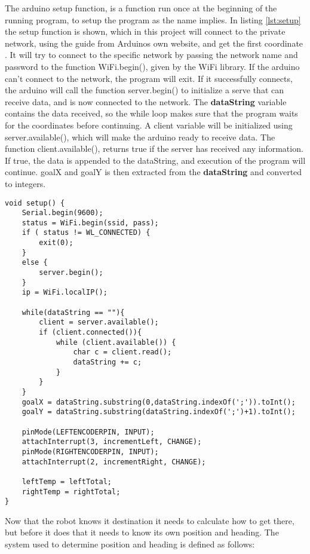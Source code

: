 The arduino setup function, is a function run once at the beginning of the running program, to setup the program as the name implies. In listing \ref{lst:setup} the setup function is shown, which in this project will connect to the private network, using the guide from Arduinos own website, and get the first coordinate \citep{wg}. \newline
It will try to connect to the specific network by passing the network name and password to the function WiFi.begin(), given by the WiFi library. If the arduino can't connect to the network, the program will exit. If it successfully connects, the arduino will call the function server.begin() to initialize a serve that can receive data, and is now connected to the network.
The \textbf{dataString}  variable contains the data received, so the while loop makes sure that the program waits for the coordinates before continuing. A client variable will be initialized using server.available(), which will make the arduino ready to receive data. The function client.available(), returns true if the server has received any information. If true, the data is appended to the dataString, and execution of the program will continue.
\newline
goalX and goalY is then extracted from the \textbf{dataString} and converted to integers.

\begin{lstlisting}[caption={The arduino setup function}, label={lst:setup}]
void setup() {
	Serial.begin(9600);           
	status = WiFi.begin(ssid, pass);
	if ( status != WL_CONNECTED) { 
		exit(0);
	} 
	else {
		server.begin();
	}
	ip = WiFi.localIP();

	while(dataString == ""){
		client = server.available();
		if (client.connected()){
			while (client.available()) {
				char c = client.read(); 
				dataString += c;
			}
		}
	}
	goalX = dataString.substring(0,dataString.indexOf(';')).toInt();
	goalY = dataString.substring(dataString.indexOf(';')+1).toInt();  
	
	pinMode(LEFTENCODERPIN, INPUT);
	attachInterrupt(3, incrementLeft, CHANGE);
	pinMode(RIGHTENCODERPIN, INPUT);
	attachInterrupt(2, incrementRight, CHANGE);
	
	leftTemp = leftTotal;
	rightTemp = rightTotal;
}
\end{lstlisting}



Now that the robot knows it destination it needs to calculate how to get there, but before it does that it needs to know its own position and heading. The system used to determine position and heading is defined as follows:


